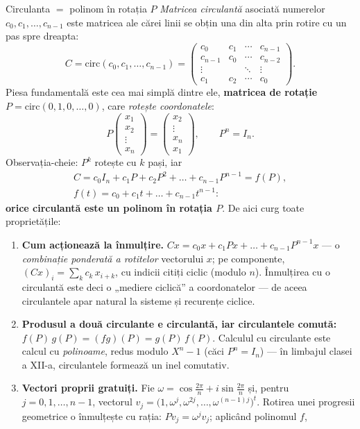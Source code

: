 \begin{tehbox}{Circulanta $=$ polinom în rotația $P$}
\emph{Matricea circulantă} asociată numerelor $c_0,c_1,\dots,c_{n-1}$ este matricea ale cărei linii se obțin una din alta prin rotire cu un pas spre dreapta:
\[
C=\mathrm{circ}(c_0,c_1,\dots,c_{n-1})=\begin{pmatrix}
c_0&c_1&\cdots&c_{n-1}\\
c_{n-1}&c_0&\cdots&c_{n-2}\\
\vdots&&\ddots&\vdots\\
c_1&c_2&\cdots&c_0
\end{pmatrix}.
\]
Piesa fundamentală este cea mai simplă dintre ele, \textbf{matricea de rotație} $P=\mathrm{circ}(0,1,0,\dots,0)$, care \emph{rotește coordonatele}:
\[
P\begin{pmatrix}x_1\\x_2\\\vdots\\x_n\end{pmatrix}=\begin{pmatrix}x_2\\\vdots\\x_n\\x_1\end{pmatrix},
\qquad P^n=I_n .
\]
Observația-cheie: $P^k$ rotește cu $k$ pași, iar
\[
\begin{gathered}
C=c_0I_n+c_1P+c_2P^2+\dots+c_{n-1}P^{n-1}=f(P),\\
f(t)=c_0+c_1t+\dots+c_{n-1}t^{n-1}:
\end{gathered}
\]
\textbf{orice circulantă este un polinom în rotația $P$}. De aici curg toate proprietățile:
\begin{enumerate}[leftmargin=*, itemsep=2pt]
\item \textbf{Cum acționează la înmulțire.} $Cx=c_0x+c_1Px+\dots+c_{n-1}P^{n-1}x$ --- o \emph{combinație ponderată a rotitelor} vectorului $x$; pe componente, $(Cx)_i=\sum_k c_k\,x_{i+k}$, cu indicii citiți ciclic (modulo $n$). Înmulțirea cu o circulantă este deci o „mediere ciclică'' a coordonatelor --- de aceea circulantele apar natural la sisteme și recurențe ciclice.
\item \textbf{Produsul a două circulante e circulantă, iar circulantele comută:} $f(P)\,g(P)=(fg)(P)=g(P)\,f(P)$. Calculul cu circulante este calcul cu \emph{polinoame}, redus modulo $X^n-1$ (căci $P^n=I_n$) --- în limbajul clasei a XII-a, circulantele formează un inel comutativ.
\item \textbf{Vectori proprii gratuiți.} Fie $\omega=\cos\frac{2\pi}n+i\sin\frac{2\pi}n$ și, pentru $j=0,1,\dots,n-1$, vectorul $v_j=\bigl(1,\omega^j,\omega^{2j},\dots,\omega^{(n-1)j}\bigr)^t$. Rotirea unei progresii geometrice o înmulțește cu rația: $Pv_j=\omega^j v_j$; aplicând polinomul $f$,

\end{enumerate}
\end{tehbox}
